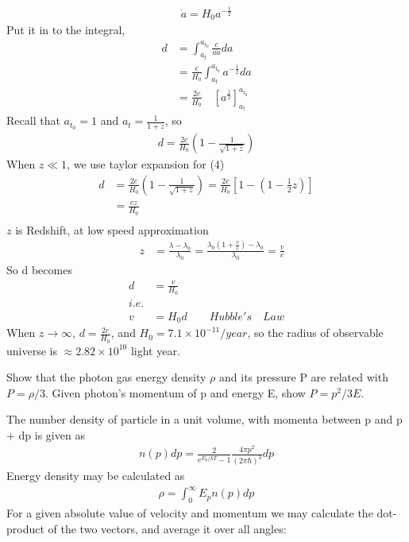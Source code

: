 \documentclass[answers]{exam}
\begin{document}
\begin{questions}
\begin{solution}
\begin{align*}
\dot{a} = H_{0}a^{-\frac{1}{2}}
\end{align*}
Put it in to the integral,
\begin{align*}
d &=\int_{a_{t}}^{a_{t_{0}}} \frac{c}{a\dot{a}}da\\
&=\frac{c}{H_{0}}\int_{a_{t}}^{a_{t_{0}}} a^{-\frac{1}{2}}da\\
&=\frac{2c}{H_{0}}\quad[a^{\frac{1}{2}}]_{a_{t}}^{a_{t_{0}}}
\end{align*}
Recall that $a_{t_{0}} = 1$ and $a_{t}=\frac{1}{1+z}$, so
\begin{align}
d=\frac{2 c}{H_{0}}\left(1-\frac{1}{\sqrt{1+z}}\right)
\end{align}
When $z \ll 1$, we use taylor expansion for (4)
\begin{align*}
d&=\frac{2 c}{H_{0}}\left(1-\frac{1}{\sqrt{1+z}}\right)=\frac{2 c}{H_{0}}\left[1-(1-\frac{1}{2}z)\right]\\
&=\frac{cz}{H_{0}}\\    
\end{align*}
$z$ is Redshift, at low speed approximation
\begin{align*}
\quad z&=\frac{\lambda-\lambda_{0}}{\lambda_{0}}=\frac{\lambda_{0}\left(1+\frac{v}{c}\right)-\lambda_{0}}{\lambda_{0}}=\frac{v}{c}
\end{align*}
So d becomes
\begin{align*}
d&=\frac{v}{H_{0}}\\  
i.e.\\
v&={H_{0}}d\qquad Hubble's\quad Law
\end{align*}
When $ z \rightarrow \infty$, $d=\frac{2 c}{H_{0}}$, and $H_{0}=7.1\times10^{-11}/year$, so the radius of observable universe is $\approx2.82\times10^{10}$ light year.
\end{solution}
\question Show that the photon gas energy density $\rho$ and its pressure P are related with $P = \rho/3$. Given photon’s momentum of p and energy E, show $P = p^2/3E$.
\begin{solution}
The number density of particle in a unit volume, with momenta between p and p + dp is given as
\begin{align*}
n(p) d p=\frac{2}{e^{E_{p}/ k T} - 1} \frac{4 \pi p^{2}}{(2\pi \hbar )^{3}} d p
\end{align*}
Energy density may be calculated as
\begin{align}
\rho = \int_{0}^{\infty}E_{p}n(p) d p
\end{align}
For a given absolute value of velocity and momentum we may calculate the dot-product of the two vectors, and average it over all angles:

\end{solution}
\end{questions}
\end{document}
